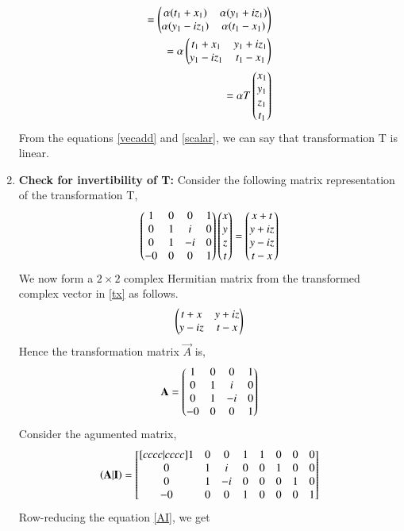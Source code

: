 \documentclass[journal,12pt,twocolumn]{IEEEtran}
\numberwithin{table}{section}
\begin{document}
\begin{enumerate}
\begin{align}
=\begin{pmatrix}\alpha(t_1+x_1)&\alpha(y_1+iz_1)\\\alpha(y_1-iz_1)&\alpha(t_1-x_1)\end{pmatrix}\\
=\alpha\begin{pmatrix}t_1+x_1&y_1+iz_1\\y_1-iz_1&t_1-x_1\end{pmatrix}\\
=\alpha T\begin{pmatrix}x_1\\y_1\\z_1\\t_1\end{pmatrix} \label{scalar}
\end{align}
From the equations \eqref{vecadd} and \eqref{scalar}, we can say that transformation T is linear.
\item \textbf{Check for invertibility of T: }
Consider the following matrix representation of the transformation T,
\begin{align}
\begin{pmatrix}1&0&0&1\\0&1&i&0\\0&1&-i&0\\-0&0&0&1\end{pmatrix}\begin{pmatrix}x\\y\\z\\t\end{pmatrix}=\begin{pmatrix}x+t\\y+iz\\y-iz\\t-x\end{pmatrix} \label{tx}
\end{align}
We now form a $2\times2$ complex Hermitian matrix from the transformed complex vector in \eqref{tx} as follows.
\begin{align}
\begin{pmatrix}t+x&y+iz\\y-iz&t-x\end{pmatrix}
\end{align}
Hence the transformation matrix $\vec{A}$ is,
\begin{align}\label{txA}
\mathbf{A}=\begin{pmatrix}1&0&0&1\\0&1&i&0\\0&1&-i&0\\-0&0&0&1\end{pmatrix}
\end{align}
Consider the agumented matrix,
\begin{equation}\label{AI}
\mathbf{\left(A|I\right)}=
  \begin{bmatrix}[cccc|cccc]
   1&0&0&1&1&0&0&0\\
   0&1&i&0&0&1&0&0\\
   0&1&-i&0&0&0&1&0\\
  -0&0&0&1&0&0&0&1\\
\end{bmatrix}
\end{equation}
Row-reducing the equation \eqref{AI}, we get
\begin{equation}\label{Ainv}

\end{equation}
\end{enumerate}
\end{document}
